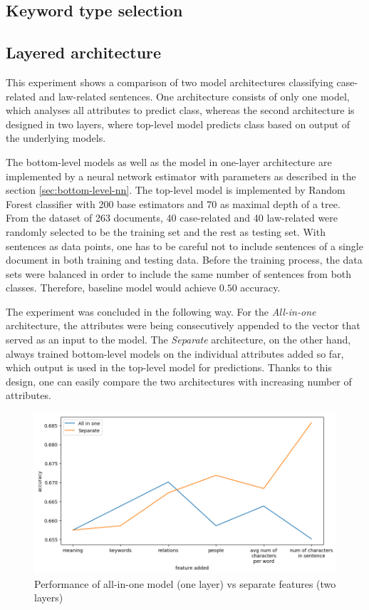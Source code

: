 \documentclass[
  digital, %
  table,   %
  lof,     %
  lot,     %
]{fithesis3}
\begin{document}
\subsection{Keyword type selection}

\subsection{Layered architecture}
\label{eval:allinone-vs-features}
This experiment shows a comparison of two model architectures classifying case-related and law-related sentences.
One architecture consists of only one model, which analyses all attributes to predict class, whereas the second architecture is designed in two layers, where top-level model predicts class based on output of the underlying models.

The bottom-level models as well as the model in one-layer architecture are implemented by a neural network estimator with parameters as described in the section \ref{sec:bottom-level-nn}.
The top-level model is implemented by Random Forest classifier with 200 base estimators and 70 as maximal depth of a tree.
From the dataset of 263 documents, 40 case-related and 40 law-related were randomly selected to be the training set and the rest as testing set.
With sentences as data points, one has to be careful not to include sentences of a single document in both training and testing data.
Before the training process, the data sets were balanced in order to include the same number of sentences from both classes.
Therefore, baseline model would achieve $0.50$ accuracy.

The experiment was concluded in the following way.
For the \textit{All-in-one} architecture, the attributes were being consecutively appended to the vector that served as an input to the model.
The \textit{Separate} architecture, on the other hand, always trained bottom-level models on the individual attributes added so far, which output is used in the top-level model for predictions.
Thanks to this design, one can easily compare the two architectures with increasing number of attributes.

\begin{figure}[H]
\caption{Performance of all-in-one model (one layer) vs separate features (two layers)}
\label{fig:eval_all-in-one}
\includegraphics[width=\textwidth]{img/eval_all-in-one}
\end{figure}
\end{document}
